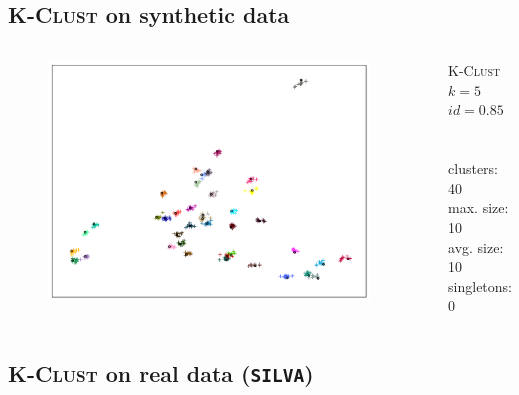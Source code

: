 \documentclass{beamer}
\begin{document}
\subsection{\textsc{K-Clust} on synthetic data}

\begin{frame}
  \begin{columns}[c]
    \begin{figure}[h]
      \includegraphics[width=0.95\textwidth]{graphics/MDS_Synthetic.pdf}
    \end{figure}

    \textsc{K-Clust} \\
    $k = 5$ \\
    $id = 0.85$ \\
    \hfill \\
    \hfill \\
    clusters: 40 \\
    max. size: 10 \\
    avg. size: 10 \\
    singletons: 0
  \end{columns}
\end{frame}


\subsection{\textsc{K-Clust} on real data (\texttt{SILVA})}
\end{document}
